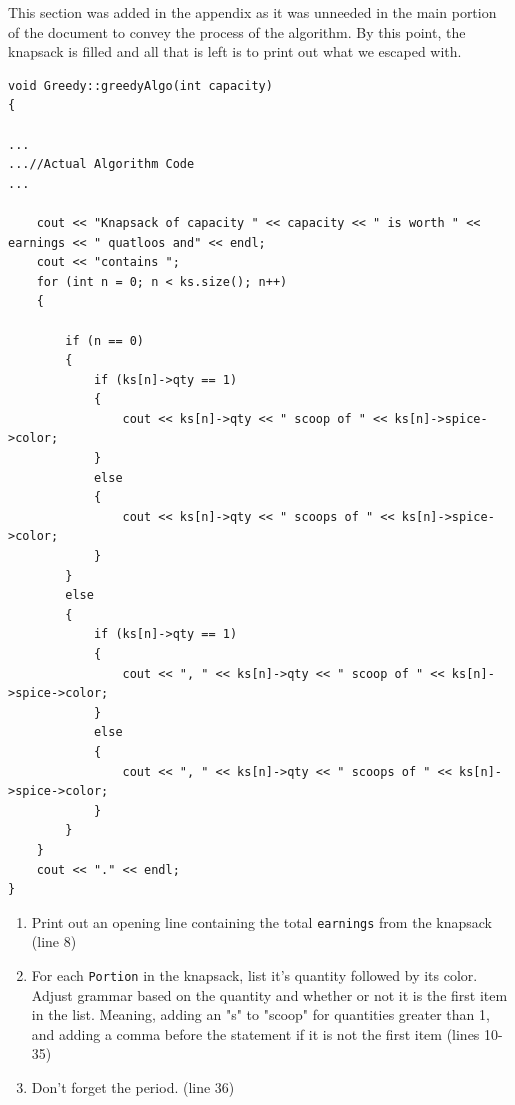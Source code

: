 \documentclass[letterpaper, 10pt]{article}
\begin{document}
This section was added in the appendix as it was unneeded in the main portion of the document to convey the process of the algorithm. By this point, the knapsack is filled and all that is left is to print out what we escaped with.

 \begin{addmargin}[-5em]{1em}
\begin{small}
\begin{verbatim}
void Greedy::greedyAlgo(int capacity)
{

...
...//Actual Algorithm Code
...

    cout << "Knapsack of capacity " << capacity << " is worth " << earnings << " quatloos and" << endl;
    cout << "contains ";
    for (int n = 0; n < ks.size(); n++)
    {

        if (n == 0)
        {
            if (ks[n]->qty == 1)
            {
                cout << ks[n]->qty << " scoop of " << ks[n]->spice->color;
            }
            else
            {
                cout << ks[n]->qty << " scoops of " << ks[n]->spice->color;
            }
        }
        else
        {
            if (ks[n]->qty == 1)
            {
                cout << ", " << ks[n]->qty << " scoop of " << ks[n]->spice->color;
            }
            else
            {
                cout << ", " << ks[n]->qty << " scoops of " << ks[n]->spice->color;
            }
        }
    }
    cout << "." << endl;
}

\end{verbatim}
\end{small}
\end{addmargin}   


\begin{enumerate}
    \item Print out an opening line containing the total \texttt{earnings} from the knapsack (line 8)
    \item For each \texttt{Portion} in the knapsack, list it's quantity followed by its color. Adjust grammar based on the quantity and whether or not it is the first item in the list. Meaning, adding an "s" to "scoop" for quantities greater than 1, and adding a comma before the statement if it is not the first item (lines 10-35)
    \item Don't forget the period. (line 36)
\end{enumerate}
\end{document}
